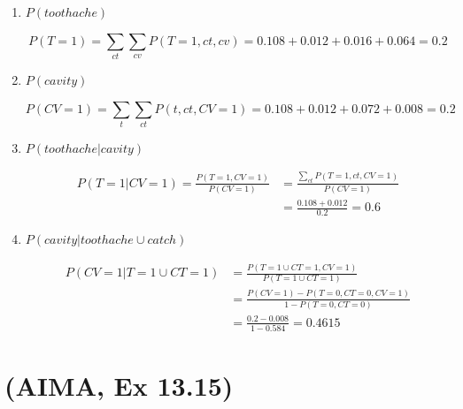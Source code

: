 \documentclass[11pt, a4paper]{article}
\begin{document}
\begin{enumerate}
    \item $P(toothache)$

    \begin{solution}
        \begin{equation*}
            P(T = 1) = \sum_{ct} \sum_{cv} P(T = 1, ct, cv) = 0.108 + 0.012 + 0.016 + 0.064 = 0.2
        \end{equation*}
    \end{solution}

    \item $P(cavity)$

    \begin{solution}
        \begin{equation*}
            P(CV = 1) = \sum_{t} \sum_{ct} P(t, ct, CV = 1) = 0.108 + 0.012 + 0.072 + 0.008 = 0.2
        \end{equation*}
    \end{solution}

    \item $P(toothache | cavity)$

    \begin{solution}
        \begin{align*}
            P(T = 1 | CV = 1) = \frac{P(T = 1, CV = 1)}{P(CV = 1)} & = \frac{\sum_{ct} P(T = 1, ct, CV = 1)}{P(CV = 1)} \\
            & = \frac{0.108 + 0.012}{0.2} = 0.6
        \end{align*}
    \end{solution}

    \item $P(cavity | toothache \cup catch)$

    \begin{solution}
        \begin{align*}
            P(CV = 1 | T = 1 \cup CT = 1) & = \frac{P(T = 1 \cup CT = 1, CV = 1)}{P(T = 1 \cup CT = 1)} \\
            & = \frac{P(CV = 1) - P(T = 0, CT = 0, CV = 1)}{1 - P(T = 0, CT = 0)} \\
            & = \frac{0.2 - 0.008}{1 - 0.584} = \num{0.4615}
        \end{align*}
    \end{solution}

\end{enumerate}

\newpage

\section{(AIMA, Ex 13.15)}
\end{document}
